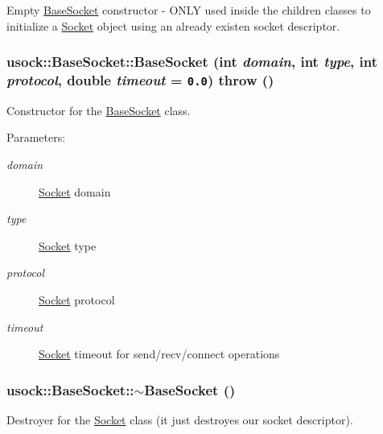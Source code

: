 Empty \hyperlink{classusock_1_1BaseSocket}{BaseSocket} constructor - ONLY used inside the children classes to initialize a \hyperlink{classusock_1_1Socket}{Socket} object using an already existen socket descriptor. 

\hypertarget{classusock_1_1BaseSocket_5cf4bfad30ea514f522101899592b97f}{
\subsubsection[{BaseSocket}]{\setlength{\rightskip}{0pt plus 5cm}usock::BaseSocket::BaseSocket (int {\em domain}, \/  int {\em type}, \/  int {\em protocol}, \/  double {\em timeout} = {\tt 0.0})  throw ()}}
\label{classusock_1_1BaseSocket_5cf4bfad30ea514f522101899592b97f}


Constructor for the \hyperlink{classusock_1_1BaseSocket}{BaseSocket} class. 

\begin{Desc}
\item[Parameters:]
\begin{description}
\item[{\em domain}]\hyperlink{classusock_1_1Socket}{Socket} domain \item[{\em type}]\hyperlink{classusock_1_1Socket}{Socket} type \item[{\em protocol}]\hyperlink{classusock_1_1Socket}{Socket} protocol \item[{\em timeout}]\hyperlink{classusock_1_1Socket}{Socket} timeout for send/recv/connect operations \end{description}
\end{Desc}
\hypertarget{classusock_1_1BaseSocket_60ad362afb927b4d4e7233c5e9735c7b}{
\subsubsection[{$\sim$BaseSocket}]{\setlength{\rightskip}{0pt plus 5cm}usock::BaseSocket::$\sim$BaseSocket ()}}
\label{classusock_1_1BaseSocket_60ad362afb927b4d4e7233c5e9735c7b}


Destroyer for the \hyperlink{classusock_1_1Socket}{Socket} class (it just destroyes our socket descriptor). 



